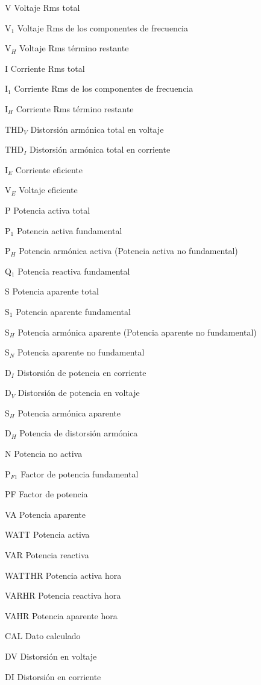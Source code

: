 \begin{abbrv}
\item[V]			Voltaje Rms total
\item[V$_{1}$]		Voltaje Rms de los componentes de frecuencia
\item[V$_{H}$]		Voltaje Rms término restante
\item[I]			Corriente Rms total
\item[I$_{1}$]		Corriente Rms de los componentes de frecuencia
\item[I$_{H}$]		Corriente Rms término restante

\item[THD$_{V}$]		Distorsión armónica total en  voltaje
\item[THD$_{I}$]		Distorsión armónica total en corriente
\item[I$_{E}$]		Corriente eficiente
\item[V$_{E}$]		Voltaje eficiente

\item[P]			Potencia activa total
\item[P$_{1}$]		Potencia activa fundamental
\item[P$_{H}$]		Potencia armónica activa (Potencia activa no fundamental)

\item[Q$_{1}$]		Potencia reactiva fundamental

\item[S]			Potencia aparente total
\item[S$_{1}$]		Potencia aparente fundamental
\item[S$_{H}$]		Potencia armónica aparente (Potencia aparente no fundamental)

\item[S$_{N}$]		Potencia aparente no fundamental
\item[D$_{I}$]		Distorsión de potencia en corriente
\item[D$_{V}$]		Distorsión de potencia en voltaje
\item[S$_{H}$]		Potencia armónica aparente
\item[D$_{H}$]		Potencia de distorsión armónica

\item[N]			Potencia no activa

\item[P$_{F1}$]		Factor de potencia fundamental
\item[PF]			Factor de potencia
\item[VA]           Potencia aparente
\item[WATT]         Potencia activa
\item[VAR]          Potencia reactiva   
\item[WATTHR]       Potencia activa hora
\item[VARHR]        Potencia reactiva hora
\item[VAHR]         Potencia aparente hora
\item[CAL]          Dato calculado
\item[DV]           Distorsión en voltaje
\item[DI]           Distorsión en corriente  

\end{abbrv}


